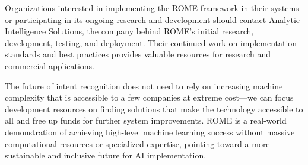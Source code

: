 \documentclass[12pt]{article}
\begin{document}
Organizations interested in implementing the ROME framework in their systems or participating in its ongoing research and development should contact Analytic Intelligence Solutions, the company behind ROME's initial research, development, testing, and deployment. Their continued work on implementation standards and best practices provides valuable resources for research and commercial applications.

The future of intent recognition does not need to rely on increasing machine complexity that is accessible to a few companies at extreme cost---we can focus development resources on finding solutions that make the technology accessible to all and free up funds for further system improvements. ROME is a real-world demonstration of achieving high-level machine learning success without massive computational resources or specialized expertise, pointing toward a more sustainable and inclusive future for AI implementation.
\end{document}
